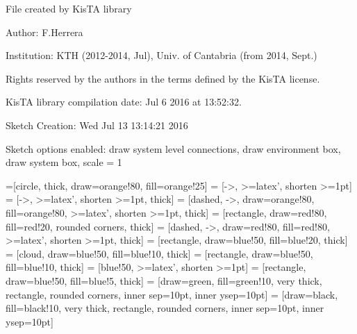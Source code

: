\documentclass[a4paper,10pt]{article}
\begin{document}
File created by KisTA library

Author: F.Herrera

Institution: KTH (2012-2014, Jul), Univ. of Cantabria (from 2014, Sept.)

Rights reserved by the authors in the terms defined by the KisTA license.

KisTA library compilation date: Jul  6 2016 at 13:52:32.



Sketch Creation: Wed Jul 13 13:14:21 2016


Sketch options enabled:
draw system level connections, draw environment box, draw system box, scale = 1
\hfill


=[circle, thick, draw=orange!80, fill=orange!25]
 = [->, >=latex', shorten >=1pt]
 = [->, >=latex', shorten >=1pt, thick]
 = [dashed, ->, draw=orange!80, fill=orange!80, >=latex', shorten >=1pt, thick]
 = [rectangle, draw=red!80, fill=red!20, rounded corners, thick]
 = [dashed, ->, draw=red!80, fill=red!80, >=latex', shorten >=1pt, thick]
 = [rectangle, draw=blue!50, fill=blue!20, thick]
 = [cloud, draw=blue!50, fill=blue!10, thick]
 = [rectangle, draw=blue!50, fill=blue!10, thick]
 = [blue!50, >=latex', shorten >=1pt]
 = [rectangle, draw=blue!50,  fill=blue!5, thick]
 = [draw=green, fill=green!10, very thick, rectangle, rounded corners, inner sep=10pt, inner ysep=10pt]
 = [draw=black, fill=black!10, very thick, rectangle, rounded corners, inner sep=10pt, inner ysep=10pt]
\end{document}
